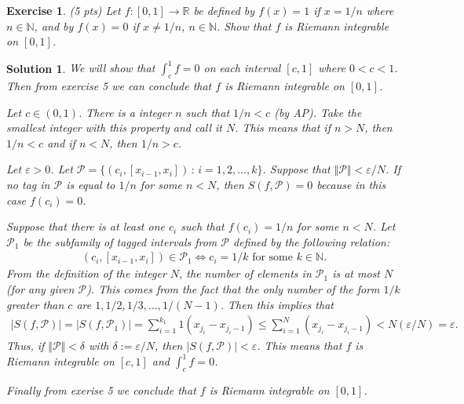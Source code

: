\documentclass[12pt]{article}
\newcommand{\bR}{\mathbb{R}}
\newcommand{\bN}{\mathbb{N}}
\newcommand{\cP}{\mathcal{P}}
\newcommand{\ra}{\rightarrow}
\theoremstyle{plain}
\newtheorem{exer}{\textbf{Exercise}}}
\theoremstyle{plain}
\newtheorem*{sol}{\textbf{Solution}}}
\theoremstyle{plain}
\theoremstyle{plain}
\begin{document}
\begin{exer}
(5 pts)
Let $f : [0, 1] \ra \bR$ be defined by $f(x) = 1$ if $x = 1/n$ where $n \in \bN$, and by $f(x) = 0$ if $x \neq 1/n$, $n \in \bN$. Show that $f$ is Riemann integrable on $[0, 1]$.
\end{exer}
\begin{sol}
We will show that $\int_c^1 f = 0$ on each interval $[c, 1]$ where $0 < c < 1$. Then from exercise 5 we can conclude that $f$ is Riemann integrable on $[0, 1]$.

Let $c \in (0, 1)$. There is a integer $n$ such that $1/n < c$ (by AP). Take the smallest integer with this property and call it $N$. This means that if $n > N$, then $1/n < c$ and if $n < N$, then $1/n > c$. 

Let $\varepsilon > 0$. Let $\cP = \{ (c_i , [x_{i - 1} , x_i]) \, : \, i = 1 , 2, \ldots , k \}$. Suppose that $\Vert \cP \Vert < \varepsilon/ N$. If no tag in $\cP$ is equal to $1/n$ for some $n < N$, then $S (f, \cP ) = 0$ because in this case $f(c_i) = 0$.

Suppose that there is at least one $c_i$ such that $f(c_i) = 1/n$ for some $n < N$. Let $\cP_1$ be the subfamily of tagged intervals from $\cP$ defined by the following relation:
	\begin{align*}
	(c_i , [x_{i- 1} , x_i]) \in \cP_1 \iff c_i = 1/k \text{ for some } k \in \bN.
	\end{align*}
From the definition of the integer $N$, the number of elements in $\cP_1$ is at most $N$ (for any given $\cP$). This comes from the fact that the only number of the form $1/k$ greater than $c$ are $1, 1/2 , 1/3 , \ldots , 1/(N-1)$. Then this implies that
	\begin{align*}
	|S(f, \cP )| = |S (f , \cP_1 ) |= \sum_{i = 1}^{k_1} 1 (x_{j_i} - x_{j_i - 1}) \leq \sum_{i = 1}^N (x_{j_i} - x_{j_i - 1}) < N (\varepsilon /N) = \varepsilon .
	\end{align*}
Thus, if $\Vert \cP \Vert < \delta$ with $\delta := \varepsilon /N$, then $|S (f, \cP )| < \varepsilon$. This means that $f$ is Riemann integrable on $[c, 1]$ and $\int_c^1 f = 0$.

Finally from exerise 5 we conclude that $f$ is Riemann integrable on $[0, 1]$.
\end{sol}
\end{document}
